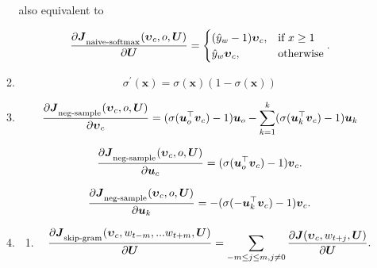 \documentclass[]{article}
\begin{document}
\begin{enumerate}
\begin{enumerate}
		also equivalent to 
		
		\begin{equation}
		{\partial 		\boldsymbol{J}_\textsubscript{naive-softmax}(\boldsymbol{\upsilon}_c, o, \boldsymbol{U}) \over \partial \boldsymbol{U}}= 
\begin{cases}
    (\hat{y}_{w} - 1) \boldsymbol{\upsilon}_c, & \text{if } x\geq 1\\
    \hat{y}_{w} \boldsymbol{\upsilon}_c, & \text{otherwise}
\end{cases}.
		\end{equation}
		
		\item
		\begin{equation}
		\sigma^{\prime}(\boldsymbol{x}) = \sigma(\boldsymbol{x}) (1 - \sigma(\boldsymbol{x}))
		\end{equation}
		
		\item
		\begin{equation}
		{\partial 		\boldsymbol{J}_\textsubscript{neg-sample}(\boldsymbol{\upsilon}_c, o, \boldsymbol{U}) \over \partial \boldsymbol{\upsilon}_c} = 
		(\sigma(\boldsymbol{u}_{o}^\top \boldsymbol{v}_c) - 1) \boldsymbol{u}_{o} -
		\sum_{k=1}^{k} (\sigma(\boldsymbol{u}_{k}^\top \boldsymbol{v}_c) - 1) \boldsymbol{u}_{k}
		\end{equation}

		\begin{equation}
		{\partial 		\boldsymbol{J}_\textsubscript{neg-sample}(\boldsymbol{\upsilon}_c, o, \boldsymbol{U}) \over \partial \boldsymbol{u}_c} = 
		(\sigma(\boldsymbol{u}_{o}^\top \boldsymbol{v}_c) - 1) \boldsymbol{v}_{c}.
		\end{equation}
		
		\begin{equation}
		{\partial 		\boldsymbol{J}_\textsubscript{neg-sample}(\boldsymbol{\upsilon}_c, o, \boldsymbol{U}) \over \partial \boldsymbol{u}_k} = 
		-(\sigma(-\boldsymbol{u}_{k}^\top \boldsymbol{v}_c) - 1) \boldsymbol{v}_{c}.
		\end{equation}
		
		\item
		
		\begin{enumerate}
			\item 
			
		\begin{equation}
		{\partial 		\boldsymbol{J}_\textsubscript{skip-gram}(\boldsymbol{\upsilon}_c, w_{t-m},... w_{t+m}, \boldsymbol{U}) \over \partial \boldsymbol{U}} = 
		\sum_{-m \leq j \leq m, j \neq 0} {\partial 		\boldsymbol{J}(\boldsymbol{\upsilon}_c, w_{t+j}, \boldsymbol{U}) \over \partial \boldsymbol{U}}.
		\end{equation}
		

\end{enumerate}
\end{enumerate}
\end{enumerate}
\end{document}
